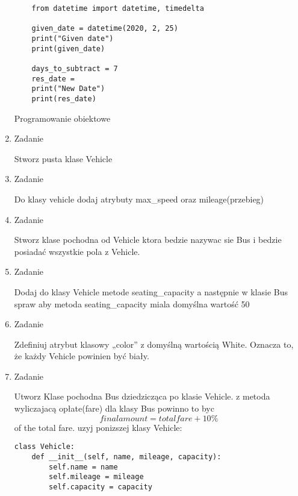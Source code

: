 \documentclass[11pt]{article}
\begin{document}
\begin{enumerate}
\begin{lstlisting}
	from datetime import datetime, timedelta
	
	given_date = datetime(2020, 2, 25)
	print("Given date")
	print(given_date)
	
	days_to_subtract = 7
	res_date = 
	print("New Date")
	print(res_date)
\end{lstlisting}


\medskip
\begin{Large}
	Programowanie obiektowe
\end{Large}

\item 
\begin{Large}
	Zadanie
\end{Large}
\par
Stworz pusta klase Vehicle

\item 
\begin{Large}
	Zadanie
\end{Large}
\par
Do klasy vehicle dodaj atrybuty max\_speed oraz mileage(przebieg)

\item 
\begin{Large}
	Zadanie
\end{Large}
\par
Stworz klase pochodna od Vehicle ktora bedzie nazywac sie Bus i bedzie posiadać wszystkie pola z Vehicle.

\item 
\begin{Large}
	Zadanie
\end{Large}
\par
Dodaj do klasy Vehicle metode seating\_capacity a następnie w klasie Bus spraw aby metoda seating\_capacity miala domyślna wartość 50


\item 
\begin{Large}
	Zadanie
\end{Large}
\par
Zdefiniuj atrybut klasowy „color” z domyślną wartością White. Oznacza to, że każdy Vehicle powinien być biały.

\item 
\begin{Large}
	Zadanie
\end{Large}
\par
Utworz Klase pochodna Bus dziedzicząca po klasie Vehicle. z metoda wyliczajacą opłate(fare) dla klasy Bus powinno to byc
\[final amount = total fare + 10\%\] of the total fare. uzyj ponizszej klasy Vehicle:
\begin{lstlisting}
class Vehicle:
	def __init__(self, name, mileage, capacity):
		self.name = name
		self.mileage = mileage
		self.capacity = capacity


\end{lstlisting}
\end{enumerate}
\end{document}
